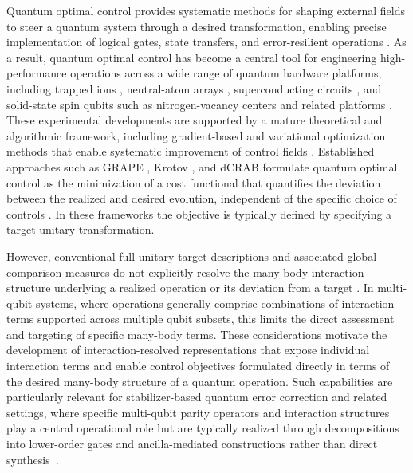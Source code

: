 \documentclass[
  aps,
  pra,
  reprint,            %
  superscriptaddress, %
  amsmath,amssymb,
  notitlepage
]{revtex4-2}
\theoremstyle{plain}
\theoremstyle{definition}
\theoremstyle{definition}
\begin{document}
Quantum optimal control provides systematic methods for shaping external fields to steer a quantum system through a desired transformation, enabling precise implementation of logical gates, state transfers, and error-resilient operations \cite{koch2022quantum}. As a result, quantum optimal control has become a central tool for engineering high-performance operations across a wide range of quantum hardware platforms, including trapped ions \cite{monz201114}, neutral-atom arrays \cite{evered2023high, levine2019parallel, omran2019generation}, superconducting circuits \cite{li2024hardware, zhao2025microwave, barnes2017fast, li2024experimental, gao2025ultrafast}, and solid-state spin qubits such as nitrogen-vacancy centers and related platforms \cite{dong2024time, ChouNVOptim, wang2025circuit}. These experimental developments are supported by a mature theoretical and algorithmic framework, including gradient-based and variational optimization methods that enable systematic improvement of control fields \cite{Grace10112007, sauvage2022optimal, khaneja2005optimal, motzoi2011optimal, caneva2011chopped, rach2015dressing, doria2011optimal, muellercontrol}.
Established approaches such as GRAPE \cite{khaneja2005optimal, de2011second, motzoi2011optimal, hogben2011spinach}, Krotov \cite{konnov1999deterministic, Reich07062014,goerz2019krotov,reich2012monotonically,goerz2014optimal}, and dCRAB \cite{caneva2011chopped, rach2015dressing, doria2011optimal, muellercontrol} formulate quantum optimal control as the minimization of a cost functional that quantifies the deviation between the realized and desired evolution, independent of the specific choice of controls \cite{glaser2015training,khaneja2005optimal, preti2022continuous, barnes2017fast, palao2013steering, reich2012monotonically, caneva2011chopped,  brif2010control, zhang2003geometric, goerz2014optimal, theis2018counteracting, guery2019shortcuts,  calzavara2025classical}. In these frameworks the objective is typically defined by specifying a target unitary transformation.

\medskip
\noindent
However, conventional full-unitary target descriptions and associated global comparison measures do not explicitly resolve the many-body interaction structure underlying a realized operation or its deviation from a target \cite{khaneja2005optimal,motzoi2011optimal, zhang2003geometric, goerz2015optimizing}. In multi-qubit systems, where operations generally comprise combinations of interaction terms supported across multiple qubit subsets, this limits the direct assessment and targeting of specific many-body terms. These considerations motivate the development of interaction-resolved representations that expose individual interaction terms and enable control objectives formulated directly in terms of the desired many-body structure of a quantum operation. Such capabilities are particularly relevant for stabilizer-based quantum error correction and related settings, where specific multi-qubit parity operators and interaction structures play a central operational role but are typically realized through decompositions into lower-order gates and ancilla-mediated constructions rather than direct synthesis~\cite{gottesman1997stabilizer,fowler2012surface,litinski2019game,taminiau2014universal,cramer2016repeated}.
\end{document}
